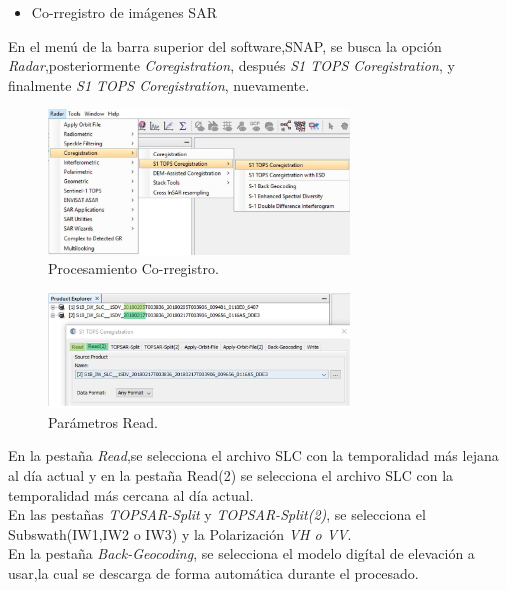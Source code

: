 \documentclass{article}
\begin{document}
\begin{itemize}
    \item Co-rregistro de imágenes SAR
\end{itemize}
En el menú de la barra superior del software,SNAP, se busca la opción \textit{Radar},posteriormente \textit{Coregistration}, después \textit{S1 TOPS Coregistration}, y finalmente \textit{S1 TOPS Coregistration}, nuevamente.


    \begin{figure}[htbp]
    \centering
    \includegraphics[width=8cm]{Imagen/03.JPG}
    \caption{Procesamiento Co-rregistro.}
    \label{fig:03}
    \end{figure}
    \begin{figure}[htbp]
    \centering
    \includegraphics[width=8cm]{Imagen/04.JPG}
    \caption{Parámetros Read.}
    \label{fig:04}
    \end{figure}
    En la pestaña \textit{Read},se selecciona el archivo SLC con la temporalidad más lejana al día actual  y en la pestaña Read(2) se selecciona el archivo SLC con la temporalidad más cercana al día actual.\\ 
    En las pestañas \textit{TOPSAR-Split} y \textit{TOPSAR-Split(2)}, se selecciona el  Subswath(IW1,IW2 o IW3) y la Polarización \textit{VH o VV}.\\ 
    En la pestaña \textit{Back-Geocoding}, se selecciona el modelo digítal de elevación a usar,la cual se descarga de forma automática durante el procesado.\\ 
\end{document}
